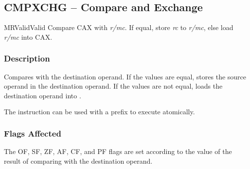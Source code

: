 \clearpage
{}
{}
\subsection*{CMPXCHG -- Compare and Exchange}

\begin{x86opcodetable}
  {MR}{Valid}{Valid}
  {Compare CAX with \emph{r/mc}. If equal, store \emph{rc} to
    \emph{r/mc}, else load \emph{r/mc} into CAX.}
\end{x86opcodetable}

\begin{x86opentable}
\end{x86opentable}

\subsubsection*{Description}

Compares \CAX{} with the destination operand.  If the values are
equal, stores the source operand in the destination operand.  If the
values are not equal, loads the destination operand into \CAX{}.

The instruction can be used with a  prefix to execute
atomically.

\subsubsection*{Flags Affected}

The OF, SF, ZF, AF, CF, and PF flags are set according to the value of
the result of comparing \CAX{} with the destination operand.
